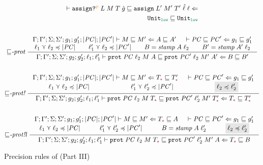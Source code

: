 \begin{figure}[tbp]
{\begin{gather*}
{\begin{align*}
                  \vdash \ccassignproj{L}{M}{T}{\hat{g}}{p} \sqsubseteq \ccassign{L'}{M'}{T'}{\hat{\ell}}{\ell} \Leftarrow \\
                  \Unit_{\low} \sqsubseteq \Unit_{\low}
              \end{align*}}
  \\[4ex]
  {\sqsubseteq}\textit{-prot}~
    \inference
        {\precctx{\Gamma}{\Gamma'}{\Sigma}{\Sigma'}{g_1}{g_1'}{|\PC|}{|\PC'|}\ccprec{M}{M'}{A}{A'} &
          \ccprec{\PC}{\PC'}{g_1}{g_1'} \\
          \ell_1 \curlyvee \ell_2 \preccurlyeq |\PC| & \ell'_1 \curlyvee \ell_2 \preccurlyeq |\PC'| &
          B = \mathit{stamp}\;A\;\ell_2 & B' = \mathit{stamp}\;A'\;\ell_2}
        {\precctx{\Gamma}{\Gamma'}{\Sigma}{\Sigma'}{g_2}{g_2'}{\ell_1}{\ell'_1}\ccprec{\ccprot{\PC}{\ell_2}{M}{A}}{\ccprot{\PC'}{\ell_2}{M'}{A'}}{B}{B'}}
  \\[4ex]
  {\sqsubseteq}\textit{-prot!}~
  \inference
  {\precctx{\Gamma}{\Gamma'}{\Sigma}{\Sigma'}{g_1}{g_1'}{|\PC|}{|\PC'|}\ccprec{M}{M'}{T_{\unk}}{T'_{\unk}} &
   \ccprec{\PC}{\PC'}{g_1}{g_1'} \\
   \ell_1 \curlyvee \ell_2 \preccurlyeq |\PC| & \ell'_1 \curlyvee \ell'_2 \preccurlyeq |\PC'| &
   \highlight{highlight}{\ell_2 \preccurlyeq \ell_2'}}
  {\precctx{\Gamma}{\Gamma'}{\Sigma}{\Sigma'}{g_2}{g_2'}{\ell_1}{\ell'_1}\ccprec{\ccprot{\PC}{\ell_2}{M}{T_{\unk}}}{\ccprot{\PC'}{\ell'_2}{M'}{T'_{\unk}}}{T_{\unk}}{T'_{\unk}}}
  \\[4ex]
  {\sqsubseteq}\textit{-prot!l}~
  \inference
      {\precctx{\Gamma}{\Gamma'}{\Sigma}{\Sigma'}{g_1}{g_1'}{|\PC|}{|\PC'|}\ccprec{M}{M'}{T_{\unk}}{A} &
          \ccprec{\PC}{\PC'}{g_1}{g_1'} \\
          \ell_1 \curlyvee \ell_2 \preccurlyeq |\PC| & \ell'_1 \curlyvee \ell'_2 \preccurlyeq |\PC'| &
          B = \mathit{stamp}\;A\;\ell_2' &
          \highlight{highlight}{\ell_2 \preccurlyeq \ell_2'}}
      {\precctx{\Gamma}{\Gamma'}{\Sigma}{\Sigma'}{g_2}{g_2'}{\ell_1}{\ell'_1}\ccprec{\ccprot{\PC}{\ell_2}{M}{T_{\unk}}}{\ccprot{\PC'}{\ell'_2}{M'}{A}}{T_{\unk}}{B}}
  \end{gather*}}
  \caption{Precision rules of \CC (Part III)}
  \label{fig:cc-prec-3}
\end{figure}


